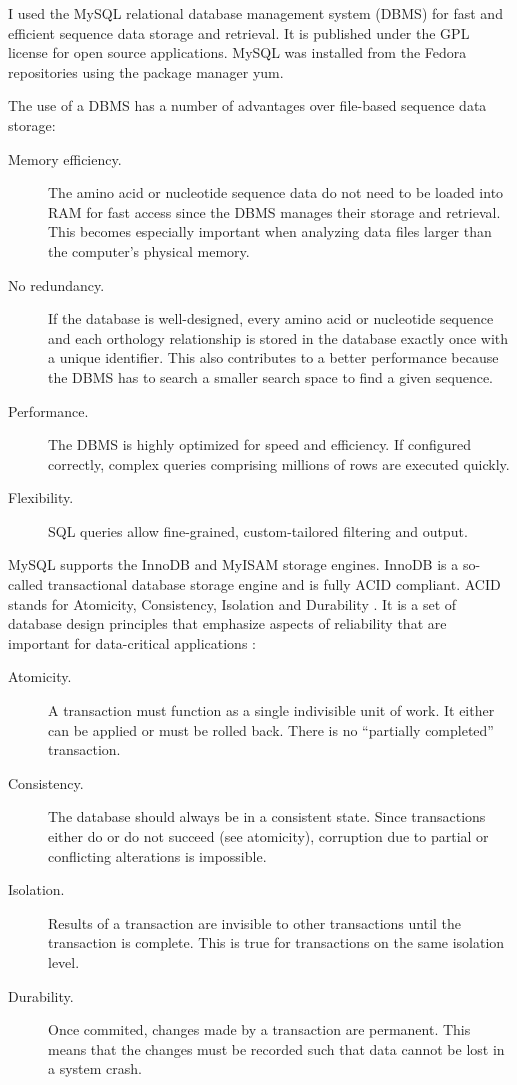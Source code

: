 \label{sec:mysql}
I used the MySQL relational database management system (DBMS) for fast and
efficient sequence data storage and retrieval. It is published under the GPL
license for open source applications. MySQL was installed from the Fedora
repositories using the package manager yum.

The use of a DBMS has a number of advantages over file-based sequence data
storage:

\begin{description}
	\item[Memory efficiency.] The amino acid or nucleotide sequence data do not
		need to be loaded into RAM for fast access since the DBMS manages their
		storage and retrieval.  This becomes especially important when analyzing data
		files larger than the computer's physical memory.
	\item[No redundancy.] If the database is well-designed, every amino acid or
		nucleotide sequence and each orthology relationship is stored in the database
		exactly once with a unique identifier. This also contributes to a better
		performance because the DBMS has to search a smaller search space to find a
		given sequence.
	\item[Performance.] The DBMS is highly optimized for speed and efficiency. If
		configured correctly, complex queries comprising millions of rows are
		executed quickly.
	\item[Flexibility.] SQL queries allow fine-grained, custom-tailored filtering
		and output.
\end{description}

MySQL supports the InnoDB \citep{mysql2013} and MyISAM \citep{mysql2013} storage
engines. InnoDB is a so-called transactional database storage engine and is
fully ACID compliant. ACID stands for Atomicity, Consistency, Isolation and
Durability \citep{haerder1983}. It is a set of database design principles that
emphasize aspects of reliability that are important for data-critical
applications \citep{schwartz2012}:

\begin{description}
	\item[Atomicity.] A transaction must function as a single indivisible unit of
		work. It either can be applied or must be rolled back. There is no
		``partially completed'' transaction.
	\item[Consistency.] The database should always be in a consistent state. Since
		transactions either do or do not succeed (see atomicity), corruption due to
		partial or conflicting alterations is impossible.
	\item[Isolation.] Results of a transaction are invisible to other
		transactions until the transaction is complete. This is true for
		transactions on the same isolation level.
	\item[Durability.] Once commited, changes made by a transaction are permanent.
		This means that the changes must be recorded such that data cannot be lost
		in a system crash. 
\end{description}

